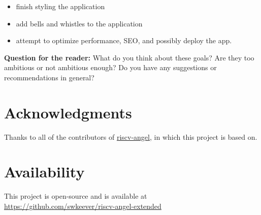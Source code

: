 \begin{itemize}
  \item finish styling the application
  \item add bells and whistles to the application
  \item attempt to optimize performance, SEO, and possibly deploy the app.
\end{itemize}

\textbf{Question for the reader:} What do you think about these goals?
Are they too ambitious or not ambitious enough?
Do you have any suggestions or recommendations in general?

\section*{Acknowledgments}

Thanks to all of the contributors of \href{https://github.com/riscv/riscv-angel}{riscv-angel},
in which this project is based on.

\section*{Availability}

This project is open-source and is available at
\href{https://github.com/swkeever/riscv-angel-extended}
{https://github.com/swkeever/riscv-angel-extended}





